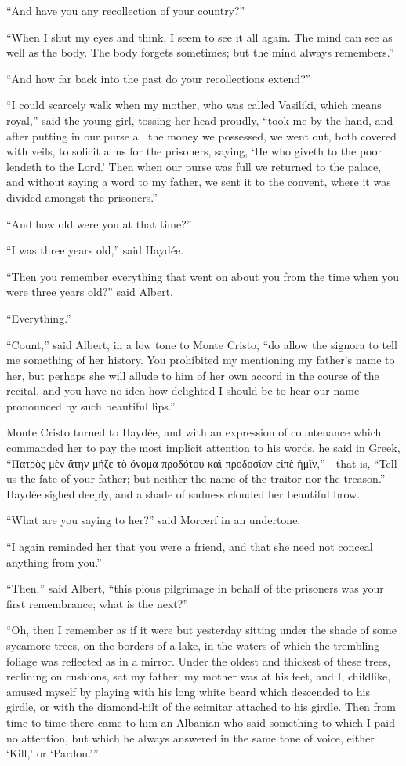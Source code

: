 “And have you any recollection of your country?”

“When I shut my eyes and think, I seem to see it all again. The mind
can see as well as the body. The body forgets sometimes; but the mind
always remembers.”

“And how far back into the past do your recollections extend?”

“I could scarcely walk when my mother, who was called Vasiliki, which
means royal,” said the young girl, tossing her head proudly, “took me
by the hand, and after putting in our purse all the money we possessed,
we went out, both covered with veils, to solicit alms for the
prisoners, saying, ‘He who giveth to the poor lendeth to the Lord.’
Then when our purse was full we returned to the palace, and without
saying a word to my father, we sent it to the convent, where it was
divided amongst the prisoners.”

“And how old were you at that time?”

“I was three years old,” said Haydée.

“Then you remember everything that went on about you from the time when
you were three years old?” said Albert.

“Everything.”

“Count,” said Albert, in a low tone to Monte Cristo, “do allow the
signora to tell me something of her history. You prohibited my
mentioning my father’s name to her, but perhaps she will allude to him
of her own accord in the course of the recital, and you have no idea
how delighted I should be to hear our name pronounced by such beautiful
lips.”

Monte Cristo turned to Haydée, and with an expression of countenance
which commanded her to pay the most implicit attention to his words, he
said in Greek, “Πατρὸς μὲν ἄτην μήζε τὸ ὄνομα προδότου καὶ προδοσίαν
εἰπὲ ἡμῖν,”—that is, “Tell us the fate of your father; but neither the
name of the traitor nor the treason.” Haydée sighed deeply, and a shade
of sadness clouded her beautiful brow.

“What are you saying to her?” said Morcerf in an undertone.

“I again reminded her that you were a friend, and that she need not
conceal anything from you.”

“Then,” said Albert, “this pious pilgrimage in behalf of the prisoners
was your first remembrance; what is the next?”

“Oh, then I remember as if it were but yesterday sitting under the
shade of some sycamore-trees, on the borders of a lake, in the waters
of which the trembling foliage was reflected as in a mirror. Under the
oldest and thickest of these trees, reclining on cushions, sat my
father; my mother was at his feet, and I, childlike, amused myself by
playing with his long white beard which descended to his girdle, or
with the diamond-hilt of the scimitar attached to his girdle. Then from
time to time there came to him an Albanian who said something to which
I paid no attention, but which he always answered in the same tone of
voice, either ‘Kill,’ or ‘Pardon.’”

